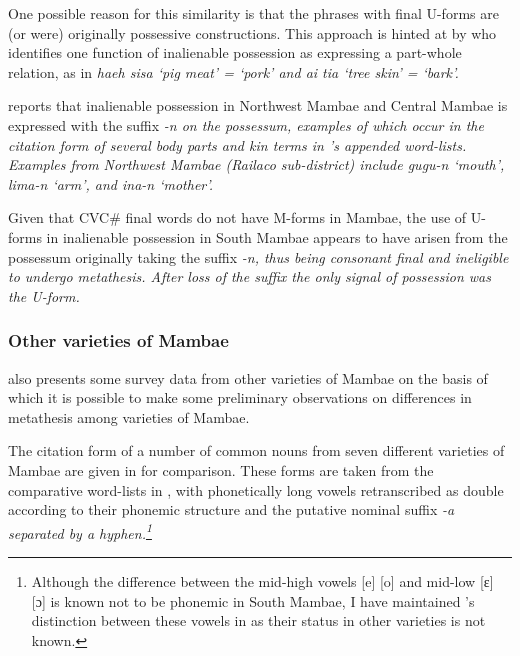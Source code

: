 One possible reason for this similarity
is that the phrases with final U-forms
are (or were) originally possessive constructions.
This approach is hinted at by \cite[147]{fo17} who
identifies one function of inalienable possession
as expressing a part-whole relation,
as in \it{haeh sisa} `pig meat' = `pork' and \it{ai tia} `tree skin' = `bark'.

\citet[146]{fo17} reports that inalienable possession in Northwest Mambae and Central Mambae
is expressed with the suffix \it{-n} on the possessum,
examples of which occur in the citation form of several
body parts and kin terms in \citeauthor{fo17}'s appended word-lists.
Examples from Northwest Mambae (Railaco sub-district) include
\it{gugu-n} `mouth', \it{lima-n} `arm', and \it{ina-n} `mother'.

Given that CVC{\#} final words do not have M-forms in Mambae,
the use of U-forms in inalienable possession in South Mambae
appears to have arisen from the possessum originally taking the suffix \it{-n},
thus being consonant final and ineligible to undergo metathesis.
After loss of the suffix the only signal of possession was the U-form.

\subsubsection{Other varieties of Mambae}\label{sec:OthVarMam}
\cite{fo17} also presents some survey data
from other varieties of Mambae on the basis of which
it is possible to make some preliminary observations on
differences in metathesis among varieties of Mambae.

The citation form of a number of common nouns from
seven different varieties of Mambae are given in 
for comparison. These forms are taken from the comparative word-lists
in \cite{fo17}, with phonetically long vowels retranscribed
as double according to their phonemic structure
and the putative nominal suffix \it{-a} separated by a hyphen.\footnote{
	Although the difference between the mid-high vowels [e] [o] and mid-low [ɛ] [ɔ]
	is known not to be phonemic in South Mambae, I have maintained \citeauthor{fo17}'s
	distinction between these vowels in  as their status
	in other varieties is not known.}

